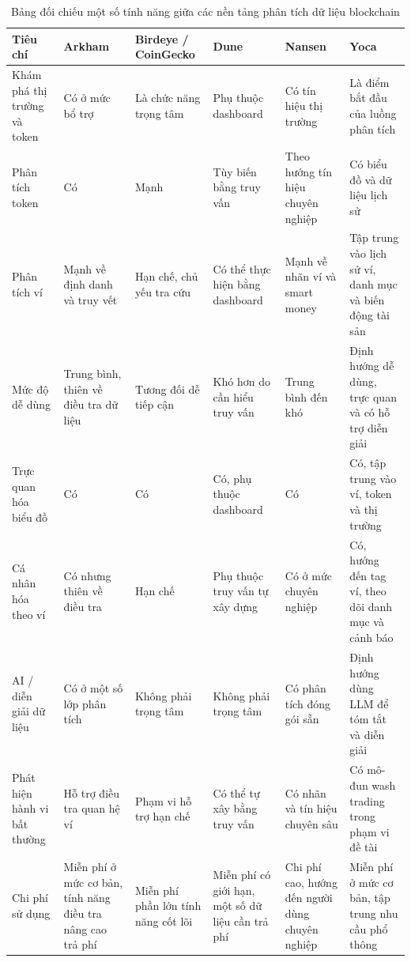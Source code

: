 \begin{table}[H]
\centering
\caption{Bảng đối chiếu một số tính năng giữa các nền tảng phân tích dữ liệu blockchain}
\label{tab:platform-comparison}
\renewcommand{\arraystretch}{1.2}
\scriptsize
{}
\begin{tabularx}{\textwidth}{|p{2.5cm}|Y|Y|Y|Y|Y|}
\hline
\textbf{Tiêu chí} 
& \textbf{Arkham} 
& \textbf{Birdeye / CoinGecko} 
& \textbf{Dune} 
& \textbf{Nansen} 
& \textbf{Yoca} \\
\hline
Khám phá thị trường và token & Có ở mức bổ trợ & Là chức năng trọng tâm & Phụ thuộc dashboard & Có tín hiệu thị trường & Là điểm bắt đầu của luồng phân tích \\
\hline

Phân tích token 
& Có 
& Mạnh 
& Tùy biến bằng truy vấn 
& Theo hướng tín hiệu chuyên nghiệp 
& Có biểu đồ và dữ liệu lịch sử \\
\hline

Phân tích ví 
& Mạnh về định danh và truy vết 
& Hạn chế, chủ yếu tra cứu 
& Có thể thực hiện bằng dashboard 
& Mạnh về nhãn ví và smart money 
& Tập trung vào lịch sử ví, danh mục và biến động tài sản \\
\hline

Mức độ dễ dùng 
& Trung bình, thiên về điều tra dữ liệu 
& Tương đối dễ tiếp cận 
& Khó hơn do cần hiểu truy vấn 
& Trung bình đến khó 
& Định hướng dễ dùng, trực quan và có hỗ trợ diễn giải \\
\hline

Trực quan hóa biểu đồ 
& Có 
& Có 
& Có, phụ thuộc dashboard 
& Có 
& Có, tập trung vào ví, token và thị trường \\
\hline

Cá nhân hóa theo ví 
& Có nhưng thiên về điều tra 
& Hạn chế 
& Phụ thuộc truy vấn tự xây dựng 
& Có ở mức chuyên nghiệp 
& Có, hướng đến tag ví, theo dõi danh mục và cảnh báo \\
\hline

AI / diễn giải dữ liệu 
& Có ở một số lớp phân tích 
& Không phải trọng tâm 
& Không phải trọng tâm 
& Có phân tích đóng gói sẵn 
& Định hướng dùng LLM để tóm tắt và diễn giải \\
\hline
Phát hiện hành vi bất thường & Hỗ trợ điều tra quan hệ ví & Phạm vi hỗ trợ hạn chế & Có thể tự xây bằng truy vấn & Có nhãn và tín hiệu chuyên sâu & Có mô-đun wash trading trong phạm vi đề tài \\
\hline

Chi phí sử dụng 
& Miễn phí ở mức cơ bản, tính năng điều tra nâng cao trả phí 
& Miễn phí phần lớn tính năng cốt lõi 
& Miễn phí có giới hạn, một số dữ liệu cần trả phí 
& Chi phí cao, hướng đến người dùng chuyên nghiệp 
& Miễn phí ở mức cơ bản, tập trung nhu cầu phổ thông \\
\hline

\end{tabularx}
\end{table}

\FloatBarrier